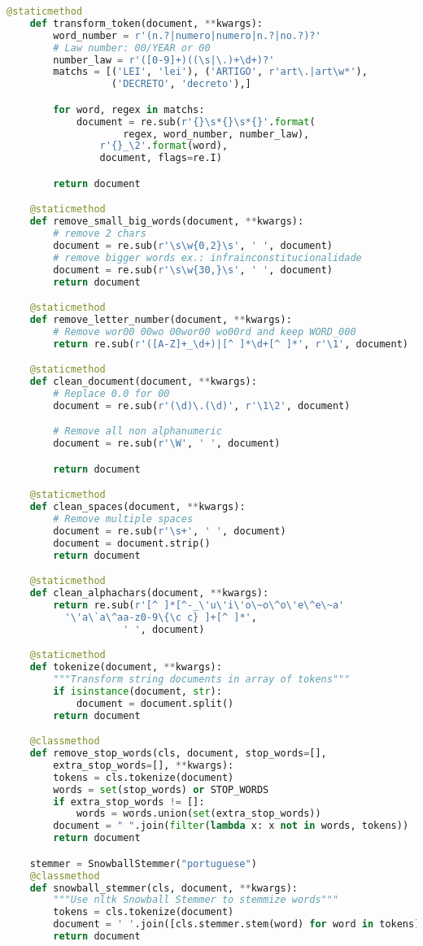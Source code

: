 \begin{apendicesenv}
\begin{lstlisting}[language=Python,extendedchars=true]
    @staticmethod
    def transform_token(document, **kwargs):
        word_number = r'(n.?|numero|numero|n.?|no.?)?'
        # Law number: 00/YEAR or 00
        number_law = r'([0-9]+)((\s|\.)+\d+)?'
        matchs = [('LEI', 'lei'), ('ARTIGO', r'art\.|art\w*'),
                  ('DECRETO', 'decreto'),]

        for word, regex in matchs:
            document = re.sub(r'{}\s*{}\s*{}'.format(
                    regex, word_number, number_law),
                r'{}_\2'.format(word),
                document, flags=re.I)

        return document

    @staticmethod
    def remove_small_big_words(document, **kwargs):
        # remove 2 chars
        document = re.sub(r'\s\w{0,2}\s', ' ', document)
        # remove bigger words ex.: infrainconstitucionalidade
        document = re.sub(r'\s\w{30,}\s', ' ', document)
        return document

    @staticmethod
    def remove_letter_number(document, **kwargs):
        # Remove wor00 00wo 00wor00 wo00rd and keep WORD_000
        return re.sub(r'([A-Z]+_\d+)|[^ ]*\d+[^ ]*', r'\1', document)

    @staticmethod
    def clean_document(document, **kwargs):
        # Replace 0.0 for 00
        document = re.sub(r'(\d)\.(\d)', r'\1\2', document)

        # Remove all non alphanumeric
        document = re.sub(r'\W', ' ', document)

        return document

    @staticmethod
    def clean_spaces(document, **kwargs):
        # Remove multiple spaces
        document = re.sub(r'\s+', ' ', document)
        document = document.strip()
        return document

    @staticmethod
    def clean_alphachars(document, **kwargs):
        return re.sub(r'[^ ]*[^-_\'u\'i\'o\~o\^o\'e\^e\~a'
          '\'a\`a\^aa-z0-9\{\c c} ]+[^ ]*',
                    ' ', document)

    @staticmethod
    def tokenize(document, **kwargs):
        """Transform string documents in array of tokens"""
        if isinstance(document, str):
            document = document.split()
        return document

    @classmethod
    def remove_stop_words(cls, document, stop_words=[],
        extra_stop_words=[], **kwargs):
        tokens = cls.tokenize(document)
        words = set(stop_words) or STOP_WORDS
        if extra_stop_words != []:
            words = words.union(set(extra_stop_words))
        document = " ".join(filter(lambda x: x not in words, tokens))
        return document

    stemmer = SnowballStemmer("portuguese")
    @classmethod
    def snowball_stemmer(cls, document, **kwargs):
        """Use nltk Snowball Stemmer to stemmize words"""
        tokens = cls.tokenize(document)
        document = ' '.join([cls.stemmer.stem(word) for word in tokens])
        return document
\end{lstlisting}

\end{apendicesenv}